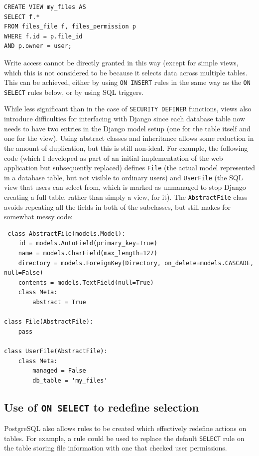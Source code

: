 \documentclass{report}
\begin{document}
\begin{verbatim}
CREATE VIEW my_files AS
SELECT f.*
FROM files_file f, files_permission p
WHERE f.id = p.file_id
AND p.owner = user;
\end{verbatim}

Write access cannot be directly granted in this way (except for simple views, which this is not considered to be because it selects data across multiple tables. This can be achieved, either by using \texttt{ON INSERT} rules in the same way as the \texttt{ON SELECT} rules below, or by using SQL triggers\cite{postgres-CREATE_VIEW}.

While less significant than in the case of \texttt{SECURITY DEFINER} functions, views also introduce difficulties for interfacing with Django since each database table now needs to have two entries in the Django model setup (one for the table itself and one for the view). Using abstract classes and inheritance allows some reduction in the amount of duplication, but this is still non-ideal. For example, the following code (which I developed as part of an initial implementation of the web application but subsequently replaced) defines \texttt{File} (the actual model represented in a database table, but not visible to ordinary users) and \texttt{UserFile} (the SQL view that users can select from, which is marked as unmanaged to stop Django creating a full table, rather than simply a view, for it). The \texttt{AbstractFile} class avoids repeating all the fields in both of the subclasses, but still makes for somewhat messy code:

\begin{verbatim}
 class AbstractFile(models.Model):
    id = models.AutoField(primary_key=True)
    name = models.CharField(max_length=127)
    directory = models.ForeignKey(Directory, on_delete=models.CASCADE, null=False)
    contents = models.TextField(null=True)
    class Meta:
        abstract = True

class File(AbstractFile):
    pass

class UserFile(AbstractFile):
    class Meta:
        managed = False
        db_table = 'my_files'
\end{verbatim}

\subsection{Use of \texttt{ON SELECT} to redefine selection}
PostgreSQL also allows rules to be created which effectively redefine actions on tables. For example, a rule could be used to replace the default \texttt{SELECT} rule on the table storing file information with one that checked user permissions.
\end{document}
